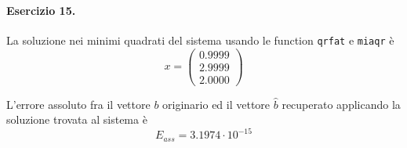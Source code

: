 \paragraph{Esercizio 15.} La soluzione nei minimi quadrati del sistema usando le function \verb|qrfat| e \verb|miaqr| è
\[
x = \begin{pmatrix}
0.9999\\
2.9999\\
2.0000
\end{pmatrix}
\]

L'errore assoluto fra il vettore $b$ originario ed il vettore $\hat{b}$ recuperato applicando la soluzione trovata al sistema è
\[
E_{ass} = 3.1974 \cdot 10^{-15}
\]